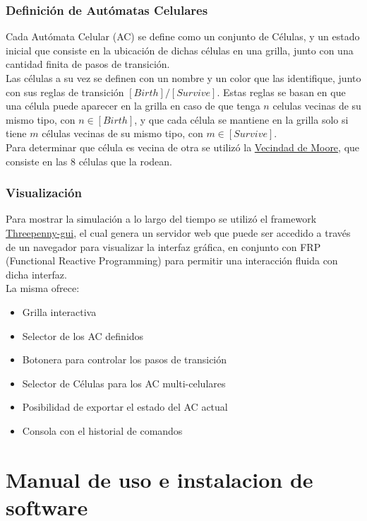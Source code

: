 \documentclass[fleqn,a4paper,11pt]{article}
\theoremstyle{mytheor}
\begin{document}
    \subsubsection{Definición de Autómatas Celulares}
    Cada Autómata Celular (AC) se define como un conjunto de Células, y un estado inicial que consiste en la ubicación de dichas células en una grilla, junto con una cantidad finita de pasos de transición. \\ 
    Las células a su vez se definen con un nombre y un color que las identifique, junto con sus reglas de transición $[Birth]/[Survive]$. Estas reglas se basan en que una célula puede aparecer en la grilla en caso de que tenga $n$ celulas vecinas de su mismo tipo, con $n \in [Birth]$, y que cada célula se mantiene en la grilla solo si tiene $m$ células vecinas de su mismo tipo, con $m \in [Survive]$.\\
    Para determinar que célula es vecina de otra se utilizó la \href{https://en.wikipedia.org/wiki/Moore_neighborhood}{Vecindad de Moore}, que consiste en las 8 células que la rodean.
    

    \subsubsection{Visualización}
   Para mostrar la simulación a lo largo del tiempo se utilizó el framework \href{https://hackage.haskell.org/package/threepenny-gui}{Threepenny-gui}, el cual genera un servidor web que puede ser accedido a través de un navegador para visualizar la interfaz gráfica, en conjunto con FRP (Functional Reactive Programming) para permitir una interacción fluida con dicha interfaz. \\
   La misma ofrece:
   \begin{itemize}
       \item Grilla interactiva
       \item Selector de los AC definidos
       \item Botonera para controlar los pasos de transición
       \item Selector de Células para los AC multi-celulares
       \item Posibilidad de exportar el estado del AC actual
       \item Consola con el historial de comandos
   \end{itemize}
  
     
\section{Manual de uso e instalacion de software}
\end{document}
